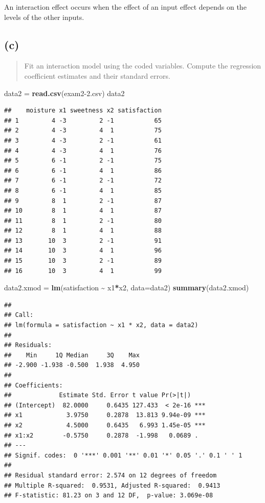 \documentclass[
]{article}
\newenvironment{Shaded}{\begin{snugshade}}{\end{snugshade}}
\newcommand{\AttributeTok}[1]{\textcolor[rgb]{0.13,0.29,0.53}{#1}}
\newcommand{\FunctionTok}[1]{\textcolor[rgb]{0.13,0.29,0.53}{\textbf{#1}}}
\newcommand{\NormalTok}[1]{#1}
\newcommand{\OtherTok}[1]{\textcolor[rgb]{0.56,0.35,0.01}{#1}}
\newcommand{\SpecialCharTok}[1]{\textcolor[rgb]{0.81,0.36,0.00}{\textbf{#1}}}
\newcommand{\StringTok}[1]{\textcolor[rgb]{0.31,0.60,0.02}{#1}}
\begin{document}
An interaction effect occurs when the effect of an input effect depends
on the levels of the other inputs.

\hypertarget{c-1}{%
\subsection{(c)}\label{c-1}}

\begin{quote}
Fit an interaction model using the coded variables. Compute the
regression coefficient estimates and their standard errors.
\end{quote}

\begin{Shaded}
\begin{Highlighting}[]
\NormalTok{data2 }\OtherTok{=} \FunctionTok{read.csv}\NormalTok{(}\StringTok{\textquotesingle{}exam2{-}2.csv\textquotesingle{}}\NormalTok{)}
\NormalTok{data2}
\end{Highlighting}
\end{Shaded}

\begin{verbatim}
##    moisture x1 sweetness x2 satisfaction
## 1         4 -3         2 -1           65
## 2         4 -3         4  1           75
## 3         4 -3         2 -1           61
## 4         4 -3         4  1           76
## 5         6 -1         2 -1           75
## 6         6 -1         4  1           86
## 7         6 -1         2 -1           72
## 8         6 -1         4  1           85
## 9         8  1         2 -1           87
## 10        8  1         4  1           87
## 11        8  1         2 -1           80
## 12        8  1         4  1           88
## 13       10  3         2 -1           91
## 14       10  3         4  1           96
## 15       10  3         2 -1           89
## 16       10  3         4  1           99
\end{verbatim}

\begin{Shaded}
\begin{Highlighting}[]
\NormalTok{data2.xmod }\OtherTok{=} \FunctionTok{lm}\NormalTok{(satisfaction }\SpecialCharTok{\textasciitilde{}}\NormalTok{ x1}\SpecialCharTok{*}\NormalTok{x2, }\AttributeTok{data=}\NormalTok{data2)}
\FunctionTok{summary}\NormalTok{(data2.xmod)}
\end{Highlighting}
\end{Shaded}

\begin{verbatim}
## 
## Call:
## lm(formula = satisfaction ~ x1 * x2, data = data2)
## 
## Residuals:
##    Min     1Q Median     3Q    Max 
## -2.900 -1.938 -0.500  1.938  4.950 
## 
## Coefficients:
##             Estimate Std. Error t value Pr(>|t|)    
## (Intercept)  82.0000     0.6435 127.433  < 2e-16 ***
## x1            3.9750     0.2878  13.813 9.94e-09 ***
## x2            4.5000     0.6435   6.993 1.45e-05 ***
## x1:x2        -0.5750     0.2878  -1.998   0.0689 .  
## ---
## Signif. codes:  0 '***' 0.001 '**' 0.01 '*' 0.05 '.' 0.1 ' ' 1
## 
## Residual standard error: 2.574 on 12 degrees of freedom
## Multiple R-squared:  0.9531, Adjusted R-squared:  0.9413 
## F-statistic: 81.23 on 3 and 12 DF,  p-value: 3.069e-08
\end{verbatim}
\end{document}

